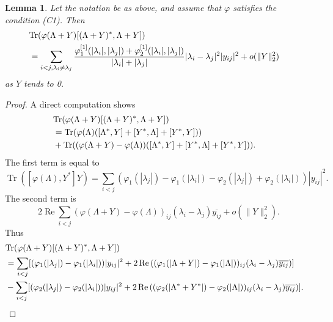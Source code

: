 \documentclass[12pt]{article}
\newtheorem{lemma}[theorem]{Lemma}
\theoremstyle{definition}
\numberwithin{equation}{section}
\DeclareMathOperator{\Tr}{Tr}
\renewcommand{\Re}{\operatorname{Re}}
\begin{document}
\begin{lemma}\label{Hessian} 
Let the notation be as above, and assume that $\varphi$ satisfies the condition (C1). 
Then 
\begin{align*}\lefteqn{\Tr(\varphi(\Lambda+Y)[(\Lambda+Y)^*,\Lambda+Y])}\\
 &= \sum_{i<j, \lambda_i\neq \lambda_j}
\frac{\varphi_1^{[1]}(|\lambda_i|,|\lambda_j|)+\varphi_2^{[1]}(|\lambda_i|,|\lambda_j|)}{|\lambda_i|+|\lambda_j|}
|\lambda_i-\lambda_j|^2|y_{ij}|^2
+o(\|Y\|_2^2)
\end{align*}
as $Y$ tends to 0. 
\end{lemma}

\begin{proof}
A direct computation shows 
\begin{align*}
\lefteqn{\Tr(\varphi(\Lambda+Y)[(\Lambda+Y)^*,\Lambda+Y])}\\
& =\Tr(\varphi(\Lambda)([\Lambda^*,Y]+[Y^*,\Lambda]+[Y^*,Y])) \\
&+\Tr((\varphi(\Lambda+Y)-\varphi(\Lambda))([\Lambda^*,Y]+[Y^*,\Lambda]+[Y^*,Y])). 
\end{align*}
The first term is equal to 
\[\Tr([\varphi(\Lambda),Y^*]Y)=\sum_{i<j}\left(\varphi_1(|\lambda_j|)-\varphi_1(|\lambda_i|)
-\varphi_2(|\lambda_j|)+\varphi_2(|\lambda_i|)\right)|y_{ij}|^2.\]
The second term is 
\[2\Re\sum_{i<j}(\varphi(\Lambda+Y)-\varphi(\Lambda))_{ij}(\lambda_i-\lambda_j)\overline{y_{ij}}
+o(\|Y\|_2^2).\]
Thus \begin{align*}
	\lefteqn{\Tr(\varphi(\Lambda+Y)[(\Lambda+Y)^*,\Lambda+Y])}\\
	& =\sum_{i<j}[(\varphi_1(|\lambda_j|)-\varphi_1(|\lambda_i|)) |y_{ij}|^2
	+2\Re\left( (\varphi_1(|\Lambda+Y|)-\varphi_1(|\Lambda|))_{ij}(\lambda_i-\lambda_j)\overline{y_{ij}}\right)]\\
	&- \sum_{i<j}[(\varphi_2(|\lambda_j|)-\varphi_2(|\lambda_i|)) |y_{ij}|^2
	+2\Re\left( (\varphi_2(|\Lambda^*+Y^*|)-\varphi_2(|\Lambda|))_{ij}(\lambda_i-\lambda_j)\overline{y_{ij}}\right)].
\end{align*}


\end{proof}
\end{document}
